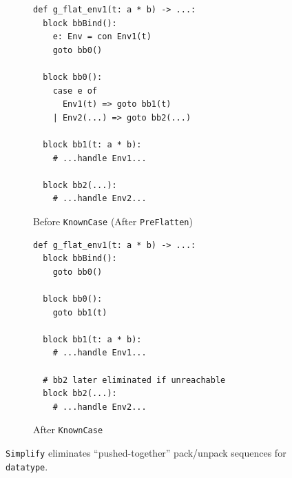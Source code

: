 \begin{figure}[htbp]
  \centering
  \begin{subfigure}[t]{0.48\textwidth}
    \caption{Before \texttt{KnownCase} (After \texttt{PreFlatten})}
    \label{fig:simplify_known_case_before}
    \vspace{1mm}
\begin{verbatim}
def g_flat_env1(t: a * b) -> ...:
  block bbBind():
    e: Env = con Env1(t)
    goto bb0()

  block bb0():
    case e of
      Env1(t) => goto bb1(t)
    | Env2(...) => goto bb2(...)

  block bb1(t: a * b):
    # ...handle Env1...

  block bb2(...):
    # ...handle Env2...
\end{verbatim}
  \end{subfigure}\hfill
  \begin{subfigure}[t]{0.48\textwidth}
    \caption{After \texttt{KnownCase}}
    \label{fig:simplify_known_case_after}
    \vspace{1mm}
\begin{verbatim}
def g_flat_env1(t: a * b) -> ...:
  block bbBind():
    goto bb0()

  block bb0():
    goto bb1(t)

  block bb1(t: a * b):
    # ...handle Env1...

  # bb2 later eliminated if unreachable
  block bb2(...):
    # ...handle Env2...
\end{verbatim}
  \end{subfigure}

  \caption{\texttt{Simplify} eliminates ``pushed-together'' pack/unpack
  sequences for \texttt{datatype}.}

  \label{fig:simplify_known_case}
\end{figure}

